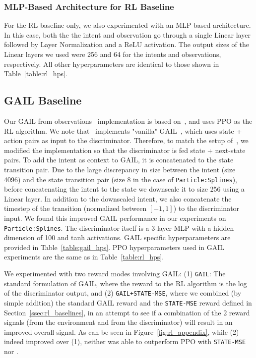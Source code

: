 \documentclass[nohyperref]{article}
\begin{document}
\subsubsection{MLP-Based Architecture for RL Baseline}
\label{app:rl_mlp}
For the RL baseline only, we also experimented with an MLP-based architecture. In this case, both the the intent and observation go through a single Linear layer followed by Layer Normalization and a ReLU activation. The output sizes of the Linear layers we used were 256 and 64 for the intents and observations, respectively. All other hyperparameters are identical to those shown in Table~\ref{table:rl_hps}.

\subsection{GAIL Baseline}
\label{app:gail}
Our GAIL from observations~\citep{torabi2018generative} implementation is based on~\citet{pytorchrl}, and uses PPO as the RL algorithm. We note that~\citet{pytorchrl} implements "vanilla" GAIL~\citep{ho2016generative}, which uses state + action pairs as input to the discriminator. Therefore, to match the setup of~\citet{torabi2018generative}, we modified the implementation so that the discriminator is fed state + next-state pairs. To add the intent as context to GAIL, it is concatenated to the state transition pair. Due to the large discrepancy in size between the intent (size 4096) and the state transition pair (size 8 in the case of \texttt{Particle:Splines}), before concatenating the intent to the state we downscale it to size 256 using a Linear layer. In addition to the downscaled intent, we also concatenate the timestep of the transition (normalized between $[-1,1]$) to the discriminator input. We found this improved GAIL performance in our experiments on \texttt{Particle:Splines}. The discriminator itself is a 3-layer MLP with a hidden dimension of 100 and tanh activations. GAIL specific hyperparameters are provided in Table~\ref{table:gail_hps}. PPO hyperparameters used in GAIL experiments are the same as in Table~\ref{table:rl_hps}.

We experimented with two reward modes involving GAIL: (1) \texttt{GAIL}: The standard formulation of GAIL, where the reward to the RL algorithm is the log of the discriminator output, and (2) \texttt{GAIL+STATE-MSE}, where we combined (by simple addition) the standard GAIL reward and the \texttt{STATE-MSE} reward defined in Section~\ref{ssec:rl_baselines}, in an attempt to see if a combination of the 2 reward signals (from the environment and from the discriminator) will result in an improved overall signal. As can be seen in Figure~\ref{fig:rl_appendix}, while (2) indeed improved over (1), neither was able to outperform PPO with \texttt{STATE-MSE} nor \methodname.
\end{document}
